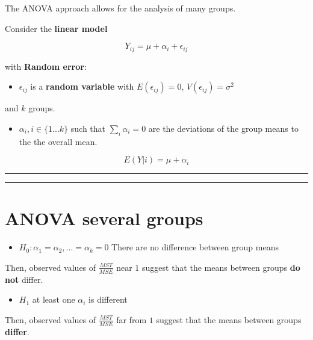 \documentclass[
]{book}
\providecommand{\tightlist}{%
  \setlength{\itemsep}{0pt}\setlength{\parskip}{0pt}}
\begin{document}
The ANOVA approach allows for the analysis of many groups.

Consider the \textbf{linear model}

\[Y_{ij} = \mu + \alpha_i +\epsilon_{ij}\]

with \textbf{Random error}:

\begin{itemize}
\tightlist
\item
  \(\epsilon_{ij}\) is a \textbf{random variable} with \(E(\epsilon_{ij})=0\), \(V(\epsilon_{ij})=\sigma^2\)
\end{itemize}

and \(k\) groups.

\begin{itemize}
\tightlist
\item
  \(\alpha_i, i \in\{1...k\}\) such that \(\sum_i \alpha_i=0\) are the deviations of the group means to the the overall mean.
\end{itemize}

\[E(Y|i)=\mu + \alpha_i\]

\begin{center}\rule{0.5\linewidth}{0.5pt}\end{center}

\begin{center}\rule{0.5\linewidth}{0.5pt}\end{center}

\hypertarget{anova-several-groups-1}{%
\section{ANOVA several groups}\label{anova-several-groups-1}}

\begin{itemize}
\tightlist
\item
  \(H_0: \alpha_1=\alpha_2, ...=\alpha_k=0\) There are no difference between group means
\end{itemize}

Then, observed values of \(\frac{MST}{MSE}\) near \(1\) suggest that the means between groups \textbf{do not} differ.

\begin{itemize}
\tightlist
\item
  \(H_1\) at least one \(\alpha_i\) is different
\end{itemize}

Then, observed values of \(\frac{MST}{MSE}\) far from \(1\) suggest that the means between groups \textbf{differ}.
\end{document}
